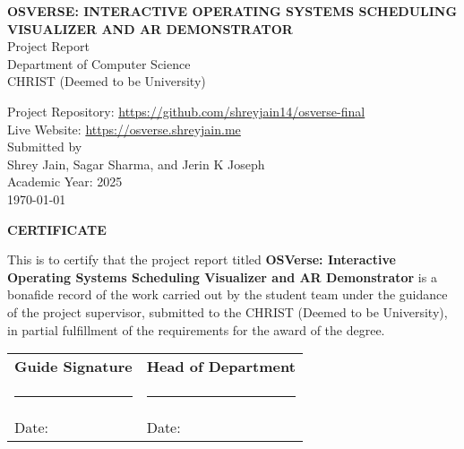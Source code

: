 \documentclass[12pt,a4paper,oneside]{report}
\newcommand{\projectTitle}{OSVerse: Interactive Operating Systems Scheduling Visualizer and AR Demonstrator}
\newcommand{\deptName}{Department of Computer Science}
\newcommand{\univName}{CHRIST (Deemed to be University)}
\newcommand{\githubURL}{https://github.com/shreyjain14/osverse-final}
\newcommand{\projectURL}{https://osverse.shreyjain.me}
\begin{document}
\begin{titlepage}
  \thispagestyle{nohf}
  \begin{center}
    {\bfseries\fontsize{16pt}{16pt}\selectfont \MakeUppercase{\projectTitle}\\[16pt]}
    \vspace{12pt}
    {\large Project Report}\\[12pt]
    \vspace{12pt}
    {\large \deptName}\\[6pt]
    {\large \univName}\\[24pt]

    \vfill

    {\large Project Repository: \href{\githubURL}{\githubURL}}\\[6pt]
    {\large Live Website: \href{\projectURL}{\projectURL}}\\[24pt]

    {\large Submitted by}\\[6pt]
    {\large Shrey Jain, Sagar Sharma, and Jerin K Joseph}\\[18pt]

    {\large Academic Year: 2025}\\[18pt]

    {\large \today}
  \end{center}
\end{titlepage}

\clearpage
\thispagestyle{nohf}
\begin{center}
  {\bfseries\fontsize{16pt}{16pt}\selectfont \MakeUppercase{Certificate}}\\[24pt]
\end{center}
\noindent This is to certify that the project report titled \textbf{\projectTitle} is a bonafide record of the work carried out by the student team under the guidance of the project supervisor, submitted to the \univName, in partial fulfillment of the requirements for the award of the degree.\\[18pt]

\vspace{36pt}
\begin{tabular}{p{}p{}}
\textbf{Guide Signature} & \textbf{Head of Department} \\
\rule{0.45\textwidth}{0.4pt} & \rule{0.45\textwidth}{0.4pt} \\
Date: & Date: \\
\end{tabular}
\end{document}
